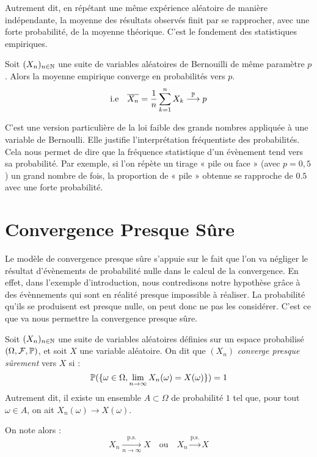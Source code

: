 Autrement dit, en répétant une même expérience aléatoire de manière indépendante, la moyenne des résultats 
observés finit par se rapprocher, avec une forte probabilité, de la moyenne théorique. 
C’est le fondement des statistiques empiriques.

\begin{corollary}
    Soit $(X_n)_{n \in \mathbb{N}}$ une suite de variables aléatoires de Bernouilli de même paramètre $p$. 
    Alors la moyenne empirique converge en probabilités vers $p$. 
    \[ \text{i.e} \quad \overline{X_n} = \frac{1}{n} \sum_{k=1}^{n} X_k \overset{\mathbb{P}}{\longrightarrow} p \] 
\end{corollary}



C’est une version particulière de la loi faible des grands nombres appliquée à une variable de Bernoulli. 
Elle justifie l’interprétation fréquentiste des probabilités. Cela nous permet de dire que la fréquence statistique d'un évènement tend vers sa probabilité. 
Par exemple, si l’on répète un tirage « pile ou face » (avec $p = 0{,}5$) un grand nombre de fois, 
la proportion de « pile » obtenue se rapproche de $0.5$ avec une forte probabilité.


\section{Convergence Presque Sûre}

Le modèle de convergence presque sûre s'appuie sur le fait que l'on va négliger le résultat d'évènements de 
probabilité nulle dans le calcul de la convergence. 
En effet, dans l'exemple d'introduction, nous contredisons notre hypothèse grâce à des évènnements qui sont 
en réalité presque impossible à réaliser. La probabilité qu'ils se produisent est presque nulle, on peut donc 
ne pas les considérer. C'est ce que va nous permettre la convergence presque sûre. 

\begin{definition}
    Soit $(X_n)_{n \in \mathbb{N}}$ une suite de variables aléatoires définies sur un espace probabilisé $(\Omega, \mathcal{F}, \mathbb{P})$, et soit $X$ une variable aléatoire.
    On dit que $(X_n)$ \emph{converge presque sûrement} vers $X$ si :
    \[ \mathbb{P}(\{ \omega \in \Omega, \lim_{n\to\infty} X_n(\omega) = X(\omega)\}) = 1\] 
    Autrement dit, il existe un ensemble $A \subset \Omega$ de probabilité $1$ tel que, pour tout $\omega \in A$, on ait $X_n(\omega) \to X(\omega)$.

    On note alors : \[ X_n \xrightarrow[n \to \infty]{\text{p.s.}} X \quad \text{ou} \quad X_n \overset{\text{p.s.}}{\longrightarrow} X \]
\end{definition}

